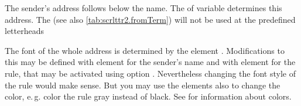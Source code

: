 The sender's address follows below the
name. The  of variable  determines this
address. The  (see also \autoref{tab:scrlttr2.fromTerm})
will not be used at the predefined letterheads

%
%
%
The font of the whole address is determined by the element
%
. Modifications to this may be defined
with element %
 for the sender's name and with element
%
 for the rule, that may be activated using
option . Nevertheless changing the font style of the rule
would make sense. But you may use the elements also to change the color,
e.\,g. color the rule gray instead of black. See \cite{package:xcolor} for
information about colors.%
%
%
%
%

